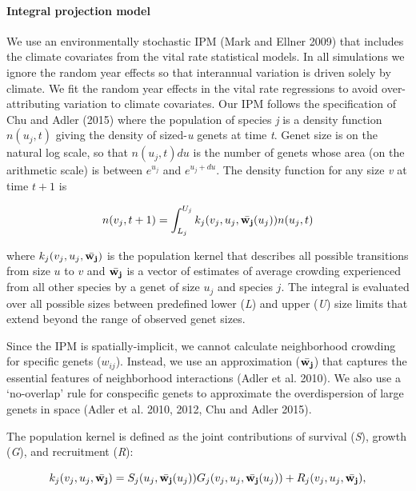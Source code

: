 \documentclass[12pt,]{article}
\begin{document}
\paragraph{Integral projection model}\label{integral-projection-model}

We use an environmentally stochastic IPM (Mark and Ellner 2009) that
includes the climate covariates from the vital rate statistical models.
In all simulations we ignore the random year effects so that interannual
variation is driven solely by climate. We fit the random year effects in
the vital rate regressions to avoid over-attributing variation to
climate covariates. Our IPM follows the specification of Chu and Adler
(2015) where the population of species \emph{j} is a density function
$n(u_{j},t)$ giving the density of sized-\emph{u} genets at time
\emph{t}. Genet size is on the natural log scale, so that $n(u_{j},t)du$
is the number of genets whose area (on the arithmetic scale) is between
$e^{u_{j}}$ and $e^{u_{j}+du}$. The density function for any size
\emph{v} at time $t+1$ is

\begin{equation}
n(v_{j},t+1) = \int_{L_{j}}^{U_{j}} k_{j}(v_{j},u_{j},\bar{\bold{w_{j}}}(u_{j}))n(u_{j},t)
\end{equation}

where $k_{j}(v_{j},u_{j},\bar{\bold{w_{j}}})$ is the population kernel
that describes all possible transitions from size $u$ to $v$ and
$\bar{\bold{w_{j}}}$ is a vector of estimates of average crowding
experienced from all other species by a genet of size $u_j$ and species
$j$. The integral is evaluated over all possible sizes between
predefined lower (\emph{L}) and upper (\emph{U}) size limits that extend
beyond the range of observed genet sizes.

Since the IPM is spatially-implicit, we cannot calculate neighborhood
crowding for specific genets ($w_{ij}$). Instead, we use an
approximation ($\bar{\bold{w_{j}}}$) that captures the essential
features of neighborhood interactions (Adler et al. 2010). We also use a
`no-overlap' rule for conspecific genets to approximate the
overdispersion of large genets in space (Adler et al. 2010, 2012, Chu
and Adler 2015).

The population kernel is defined as the joint contributions of survival
(\emph{S}), growth (\emph{G}), and recruitment (\emph{R}):

\begin{equation}
k_{j}(v_{j},u_{j},\bar{\bold{w_{j}}}) = S_j(u_j, \bar{\bold{w_{j}}}(u_{j}))G_j(v_{j},u_{j},\bar{\bold{w_{j}}}(u_{j})) + R_j(v_{j},u_{j},\bar{\bold{w_{j}}}),
\end{equation}
\end{document}
